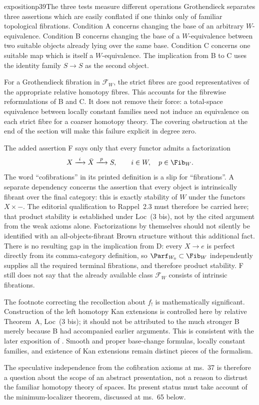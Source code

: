 \begin{dcomment}{exposition}{p39}{The three tests measure different operations}
Grothendieck separates three assertions which are easily conflated if one thinks only of familiar topological fibrations. Condition A concerns changing the base of an arbitrary $W$-equivalence. Condition B concerns changing the base of a $W$-equivalence between two suitable objects already lying over the same base. Condition C concerns one suitable map which is itself a $W$-equivalence. The implication from B to C uses the identity family $S\to S$ as the second object.

For a Grothendieck fibration in $\mathcal F_W$, the strict fibres are good representatives of the appropriate relative homotopy fibres. This accounts for the fibrewise reformulations of B and C. It does not remove their force: a total-space equivalence between locally constant families need not induce an equivalence on each strict fibre for a coarser homotopy theory. The covering obstruction at the end of the section will make this failure explicit in degree zero.

The added assertion F says only that every functor admits a factorization
\[
 X\xrightarrow{\ i\ }\bar X\xrightarrow{\ p\ }S,
 \qquad i\in W,\quad p\in\Fib_W.
\]
The word ``cofibrations'' in its printed definition is a slip for ``fibrations''. A separate dependency concerns the assertion that every object is intrinsically fibrant over the final category: this is exactly stability of $W$ under the functors $X\times-$. The editorial qualification to Rappel~2.3 must therefore be carried here; that product stability is established under Loc~(3 bis), not by the cited argument from the weak axioms alone. Factorizations by themselves should not silently be identified with an all-objects-fibrant Brown structure without this additional fact. There is no resulting gap in the implication from D: every $X\to e$ is perfect directly from its comma-category definition, so $\Parf_{W_0}\subset\Fib_W$ independently supplies all the required terminal fibrations, and therefore product stability. F still does not say that the already available class $\mathcal F_W$ consists of intrinsic fibrations.

The footnote correcting the recollection about $f_!$ is mathematically significant. Construction of the left homotopy Kan extensions is controlled here by relative Theorem~A, Loc~(3 bis); it should not be attributed to the much stronger B merely because B had accompanied earlier arguments. This is consistent with the later exposition of \citet[pp.~3--4]{Maltsiniotis2005Asphericite}. Smooth and proper base-change formulas, locally constant families, and existence of Kan extensions remain distinct pieces of the formalism.

The speculative independence from the cofibration axioms at ms.~37 is therefore a question about the scope of an abstract presentation, not a reason to distrust the familiar homotopy theory of spaces. Its present status must take account of the minimum-localizer theorem, discussed at ms.~65 below.
\end{dcomment}

